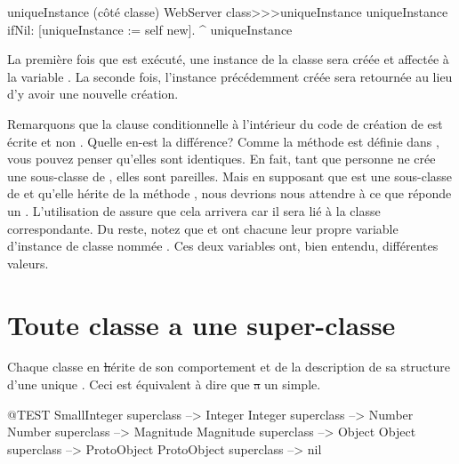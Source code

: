 \documentclass[a4paper,10pt,twoside]{book}
\begin{document}
\begin{method}[uniqueInstance]{uniqueInstance (c\^ot\'e classe)}
WebServer class>>>uniqueInstance
     uniqueInstance ifNil: [uniqueInstance := self new].
     ^ uniqueInstance
\end{method}

La premi\`ere fois que  est ex\'ecut\'e, une instance de la classe  sera cr\'e\'ee et affect\'ee \`a la variable . 
La seconde fois, l'instance pr\'ec\'edemment cr\'e\'ee sera retourn\'ee au lieu d'y avoir une nouvelle cr\'eation. 

Remarquons que la clause conditionnelle \`a l'int\'erieur du code de cr\'eation
de  est \'ecrite  et non 
\mbox{.}
Quelle en-est la diff\'erence?   Comme la m\'ethode  est d\'efinie dans , vous pouvez penser qu'elles sont identiques.    En fait, tant que personne ne cr\'ee une sous-classe de , elles sont pareilles. Mais en supposant que  est une sous-classe de  et qu'elle h\'erite de la m\'ethode ,
nous devrions nous attendre \`a ce que  r\'eponde un . L'utilisation de \self assure que cela arrivera car il sera li\'e \`a la classe correspondante.
Du reste, notez que  et  ont chacune
leur propre variable d'instance de classe nomm\'ee .  Ces
deux variables ont, bien entendu, diff\'erentes valeurs.

\section{Toute classe a une super-classe}


Chaque classe en \st h\'erite de son comportement et de la description
de sa structure d'une unique .
Ceci est \'equivalent \`a dire que \st a un  simple.

\begin{code}{@TEST}
SmallInteger superclass --> Integer
Integer superclass          --> Number
Number superclass        --> Magnitude
Magnitude superclass    --> Object
Object superclass           --> ProtoObject
ProtoObject superclass  --> nil
\end{code}
\end{document}
